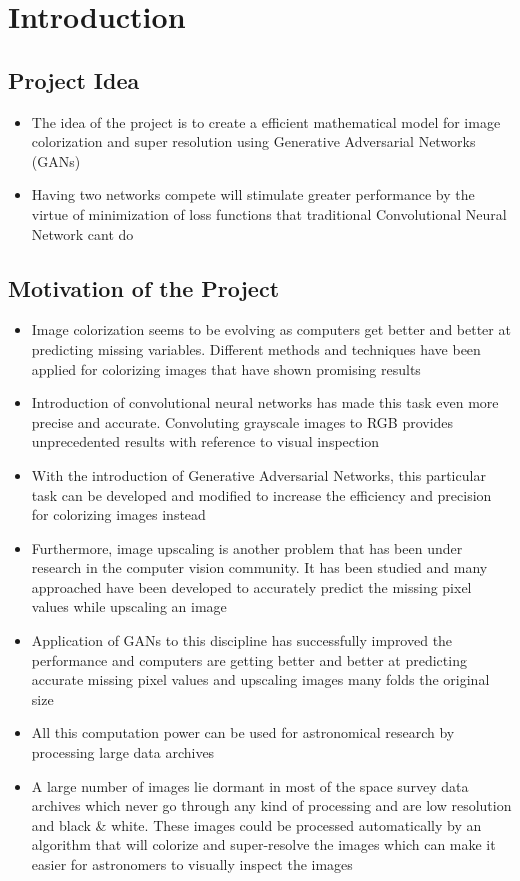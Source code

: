 \documentclass[oneside,a4paper,12pt]{report}
\begin{document}
\setlength{\parindent}{11mm}





\chapter{Introduction}
\section{Project Idea}
\begin{itemize}
\item The idea of the project is to create a efficient mathematical model for image colorization and super resolution using Generative Adversarial Networks (GANs)
\item Having two networks compete will stimulate greater performance by the virtue of minimization of loss functions that traditional Convolutional Neural Network cant do
\end{itemize}


\section{Motivation of the Project}
\begin{itemize}
\item Image colorization seems to be evolving as computers get better and better at predicting missing variables. Different methods and techniques have been applied for colorizing images that have shown promising results
\item Introduction of convolutional neural networks has made this task even more precise and accurate. Convoluting grayscale images to RGB provides unprecedented results with reference to visual inspection
\item With the introduction of Generative Adversarial Networks, this particular task can be developed and modified to increase the efficiency and precision for colorizing images instead
\item Furthermore, image upscaling is another problem that has been under research in the computer vision community. It has been studied and many approached have been developed to accurately predict the missing pixel values while upscaling an image
\item Application of GANs to this discipline has successfully improved the performance and computers are getting better and better at predicting accurate missing pixel values and upscaling images many folds the original size
\item All this computation power can be used for astronomical research by processing large data archives 
\item A large number of images lie dormant in most of the space survey data archives which never go through any kind of processing and are low resolution and black \& white. These images could be processed automatically by an algorithm that will colorize and super-resolve the images which can make it easier for astronomers to visually inspect the images
\end{itemize}
\end{document}

